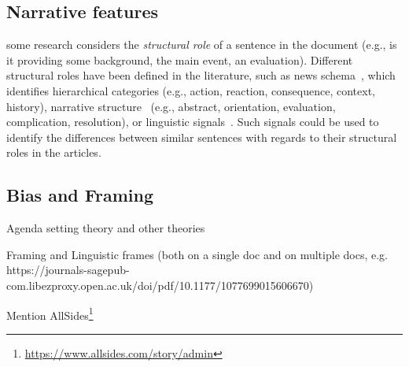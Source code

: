 \subsection{Narrative features}

\cite{zahid2019towards}

some research considers the \emph{structural role} of a sentence in the document (e.g., is it providing some background, the main event, an evaluation).
Different structural roles have been defined in the literature, such as 
news schema~\cite{bell1991language}, which identifies hierarchical categories (e.g., action, reaction, consequence, context, history), narrative structure~\cite{bell2005news} (e.g., abstract, orientation, evaluation, complication, resolution), or linguistic signals~\cite{zahid2019towards,marcu2000theory}. 
Such signals could be used to identify the differences between similar sentences with regards to their structural roles in the articles. 

\subsection{Bias and Framing}

Agenda setting theory and other theories

Framing and Linguistic frames (both on a single doc and on multiple docs, e.g. https://journals-sagepub-com.libezproxy.open.ac.uk/doi/pdf/10.1177/1077699015606670)

Mention AllSides\footnote{\url{https://www.allsides.com/story/admin}}

